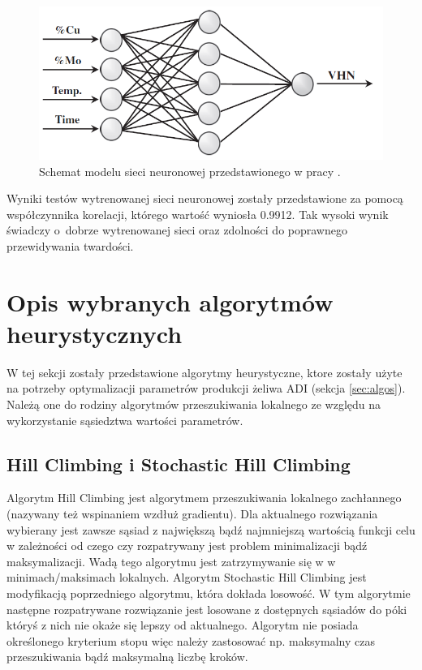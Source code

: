 \begin{figure}[ht]{}
	\centering
	\includegraphics[scale=0.5]{images/model_vhn_pourasiabi.png}
	\caption {
		 Schemat modelu sieci neuronowej przedstawionego w pracy \cite{POURASIABI2012782}.
	}
	\label{fig:sch-vhn-pourasiabi}
\end{figure}

Wyniki testów wytrenowanej sieci neuronowej zostały przedstawione za pomocą współczynnika korelacji, którego wartość wyniosła 0.9912. Tak wysoki wynik świadczy o~dobrze wytrenowanej sieci oraz zdolności do poprawnego przewidywania twardości.



\section{Opis wybranych algorytmów heurystycznych}
W tej sekcji zostały przedstawione algorytmy heurystyczne, ktore zostały użyte na potrzeby optymalizacji parametrów produkcji żeliwa ADI (sekcja \ref{sec:algos}). Należą one do rodziny algorytmów przeszukiwania lokalnego ze względu na wykorzystanie sąsiedztwa wartości parametrów.

\subsection{Hill Climbing i Stochastic Hill Climbing}
Algorytm Hill Climbing \cite{hillclimbing} jest algorytmem przeszukiwania lokalnego zachłannego (nazywany też wspinaniem wzdłuż gradientu). Dla aktualnego rozwiązania wybierany jest zawsze sąsiad z największą bądź najmniejszą wartością funkcji celu w zależności od czego czy rozpatrywany jest problem minimalizacji bądź maksymalizacji. Wadą tego algorytmu jest zatrzymywanie się w w minimach/maksimach lokalnych. Algorytm Stochastic Hill Climbing jest modyfikacją poprzedniego algorytmu, która dokłada losowość. W tym algorytmie następne rozpatrywane rozwiązanie jest losowane z dostępnych sąsiadów do póki któryś z nich nie okaże się lepszy od aktualnego. Algorytm nie posiada określonego kryterium stopu więc należy zastosować np. maksymalny czas przeszukiwania bądź maksymalną liczbę kroków.


